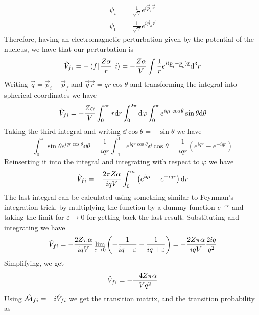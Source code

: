 \documentclass[../qm.tex]{subfiles}
\begin{document}
\begin{equation}
	\begin{aligned}
		\psi_i&=\frac{1}{\sqrt{V}}e^{i\vec{p}_i\vec{r}}\\
		\psi_0&=\frac{1}{\sqrt{V}}e^{i\vec{p}_o\vec{r}}
	\end{aligned}
	\label{eq:inoutpsi}
\end{equation}
Therefore, having an electromagnetic perturbation given by the potential of the nucleus, we have that our perturbation is
\begin{equation*}
	\hat{V}_{fi}=-\bra{f}\frac{Z\alpha}{r}\ket{i}=-\frac{Z\alpha}{V}\int_{}^{}\frac{1}{r}e^{i(\underline{p}_i-\underline{p}_o)\underline{r}}\dd^3r
\end{equation*}
Writing $\vec{q}=\vec{p}_i-\vec{p}_f$ and $\vec{q}\vec{r}=qr\cos\theta$ and transforming the integral into spherical coordinates we have
\begin{equation*}
	\hat{V}_{fi}=-\frac{Z\alpha}{V}\int_{0}^{\infty}r\dd r\int_{0}^{2\pi}\dd\varphi\int_{0}^{\pi}e^{iqr\cos\theta}\sin\theta\dd\theta
\end{equation*}
Taking the third integral and writing $\dd\cos\theta=-\sin\theta$ we have
\begin{equation*}
	\int_{0}^{\pi}\sin\theta e^{iqr\cos\theta}\dd\theta=\frac{1}{iqr}\int_{-1}^{1}e^{iqr\cos\theta}\dd\cos\theta=\frac{1}{iqr}\left( e^{iqr}-e^{-iqr} \right)
\end{equation*}
Reinserting it into the integral and integrating with respect to $\varphi$ we have
\begin{equation*}
	\hat{V}_{fi}=-\frac{2\pi Z\alpha}{iqV}\int_{0}^{\infty}\left( e^{iqr}-e^{-iqr} \right)\dd r
\end{equation*}
The last integral can be calculated using something similar to Feynman's integration trick, by multiplying the function by a dummy function $e^{-\varepsilon r}$ and taking the limit for $\varepsilon\to0$ for getting back the last result. Substituting and integrating we have
\begin{equation*}
	\hat{V}_{fi}=-\frac{2Z\pi\alpha}{iqV}\lim_{\varepsilon\to0}\left( -\frac{1}{iq-\varepsilon}-\frac{1}{iq+\varepsilon} \right)=-\frac{2Z\pi\alpha}{iqV}\frac{2iq}{q^2}
\end{equation*}
Simplifying, we get
\begin{equation}
	\hat{V}_{fi}=-\frac{-4Z\pi\alpha}{Vq^2}
	\label{eq:pertmatrixruthfeynman}
\end{equation}
Using $\hat{\mathcal{M}}_{fi}=-i\hat{V}_{fi}$ we get the transition matrix, and the transition probability as
\end{document}
